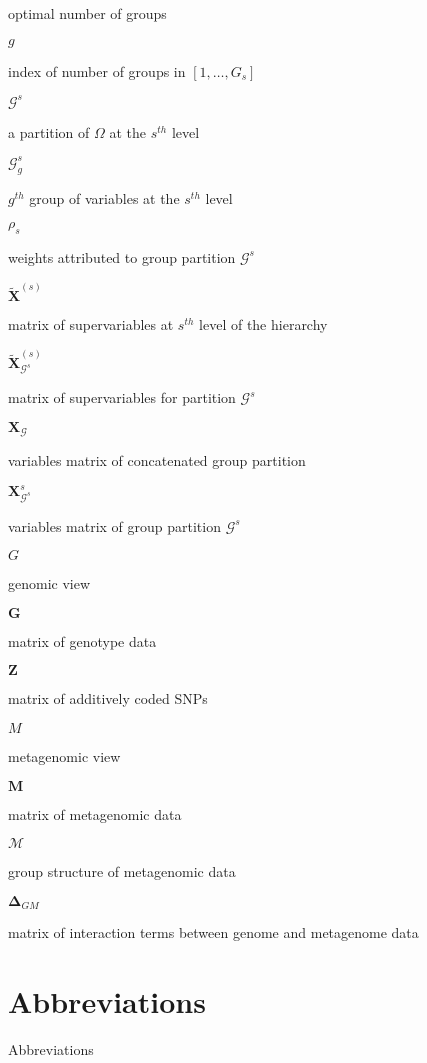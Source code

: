 \documentclass[]{book}
\begin{document}
optimal number of groups

\(g\)

index of number of groups in \([1, \dots, G_s]\)

\(\mathcal{G}^s\)

a partition of \(\Omega\) at the \(s^{th}\) level

\(\mathcal{G}^s_g\)

\(g^{th}\) group of variables at the \(s^{th}\) level

\(\rho_s\)

weights attributed to group partition \(\mathcal{G}^s\)

\(\tilde{\mathbf{X}}^{(s)}\)

matrix of supervariables at \(s^{th}\) level of the hierarchy

\(\tilde{\mathbf{X}}^{(s)}_{\mathcal{G}^s}\)

matrix of supervariables for partition \(\mathcal{G}^s\)

\(\mathbf{X}_{\mathcal{G}}\)

variables matrix of concatenated group partition

\(\mathbf{X}^s_{\mathcal{G}^s}\)

variables matrix of group partition \(\mathcal{G}^s\)

\(\mathit{G}\)

genomic view

\(\mathbf{G}\)

matrix of genotype data

\(\mathbf{Z}\)

matrix of additively coded SNPs

\(\mathit{M}\)

metagenomic view

\(\mathbf{M}\)

matrix of metagenomic data

\(\mathcal{M}\)

group structure of metagenomic data

\(\boldsymbol{\Delta}_{\mathit{G}\mathit{M}}\)

matrix of interaction terms between genome and metagenome data

\hypertarget{abbreviations}{%
\chapter*{Abbreviations}\label{abbreviations}}

Abbreviations
\end{document}
